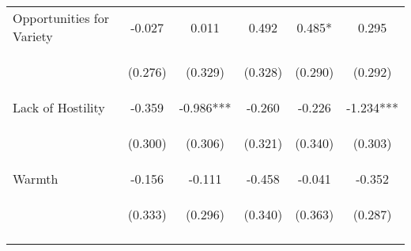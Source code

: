 \begin{tabular}{lccccc}
\noalign{\smallskip}Opportunities for Variety & -0.027 & 0.011 & 0.492 & 0.485* & 0.295\\
 & \begin{footnotesize}(0.276)\end{footnotesize} & \begin{footnotesize}(0.329)\end{footnotesize} & \begin{footnotesize}(0.328)\end{footnotesize} & \begin{footnotesize}(0.290)\end{footnotesize} & \begin{footnotesize}(0.292)\end{footnotesize}\\
\noalign{\smallskip}Lack of Hostility & -0.359 & -0.986*** & -0.260 & -0.226 & -1.234***\\
 & \begin{footnotesize}(0.300)\end{footnotesize} & \begin{footnotesize}(0.306)\end{footnotesize} & \begin{footnotesize}(0.321)\end{footnotesize} & \begin{footnotesize}(0.340)\end{footnotesize} & \begin{footnotesize}(0.303)\end{footnotesize}\\
\noalign{\smallskip}Warmth & -0.156 & -0.111 & -0.458 & -0.041 & -0.352\\
 & \begin{footnotesize}(0.333)\end{footnotesize} & \begin{footnotesize}(0.296)\end{footnotesize} & \begin{footnotesize}(0.340)\end{footnotesize} & \begin{footnotesize}(0.363)\end{footnotesize} & \begin{footnotesize}(0.287)\end{footnotesize}\\
\noalign{\smallskip}\hline\end{tabular}\\
